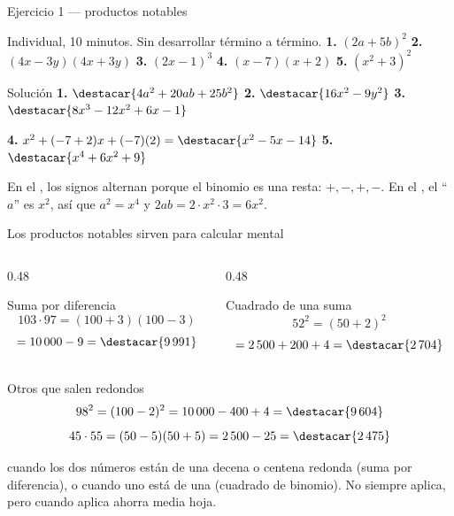 \documentclass[aspectratio=169,10pt]{beamer}
\begin{document}
\begin{frame}{Ejercicio 1 — productos notables}
  \scriptsize
  \begin{alertblock}{Individual, 10 minutos. Sin desarrollar término a término.}
    \tiny
    \textbf{1.} $(2a+5b)^{2}$ \qquad
    \textbf{2.} $(4x-3y)(4x+3y)$ \qquad
    \textbf{3.} $(2x-1)^{3}$ \qquad
    \textbf{4.} $(x-7)(x+2)$ \qquad
    \textbf{5.} $(x^{2}+3)^{2}$
  \end{alertblock}

  \vspace{0.06cm}
  \begin{block}{Solución}
    \tiny
    \textbf{1.} $\destacar{4a^{2}+20ab+25b^{2}}$ \qquad
    \textbf{2.} $\destacar{16x^{2}-9y^{2}}$ \qquad
    \textbf{3.} $\destacar{8x^{3}-12x^{2}+6x-1}$

    \vspace{0.08cm}
    \textbf{4.} $x^{2}+(-7+2)x+(-7)(2)
    = \destacar{x^{2}-5x-14}$ \qquad
    \textbf{5.} $\destacar{x^{4}+6x^{2}+9}$
  \end{block}

  \vspace{0.05cm}
  {\tiny\color{uniGris} En el , los signos alternan porque el
  binomio es una resta: $+,-,+,-$. En el , el ``$a$'' es $x^{2}$,
  así que $a^{2}=x^{4}$ y $2ab = 2\cdot x^{2}\cdot 3 = 6x^{2}$.}
\end{frame}

\begin{frame}{Los productos notables sirven para calcular mental}
  \scriptsize
  \begin{columns}[T,onlytextwidth]
    \begin{column}{0.48\textwidth}
      \begin{exampleblock}{Suma por diferencia}
        \tiny
        \[ 103\cdot 97 = (100+3)(100-3) \]
        \[ = 10\,000 - 9 = \destacar{9\,991} \]
      \end{exampleblock}
    \end{column}
    \begin{column}{0.48\textwidth}
      \begin{exampleblock}{Cuadrado de una suma}
        \tiny
        \[ 52^{2} = (50+2)^{2} \]
        \[ = 2\,500 + 200 + 4 = \destacar{2\,704} \]
      \end{exampleblock}
    \end{column}
  \end{columns}

  \vspace{0.12cm}
  \begin{block}{Otros que salen redondos}
    \tiny
    \[ 98^{2} = (100-2)^{2} = 10\,000-400+4 = \destacar{9\,604} \]
    \[ 45\cdot 55 = (50-5)(50+5) = 2\,500-25 = \destacar{2\,475} \]
  \end{block}

  \vspace{0.08cm}
  {\tiny\color{uniGris}  cuando los dos
  números están  de una decena o centena redonda
  (suma por diferencia), o cuando uno está  de una (cuadrado de
  binomio). No siempre aplica, pero cuando aplica ahorra media hoja.}
\end{frame}
\end{document}

